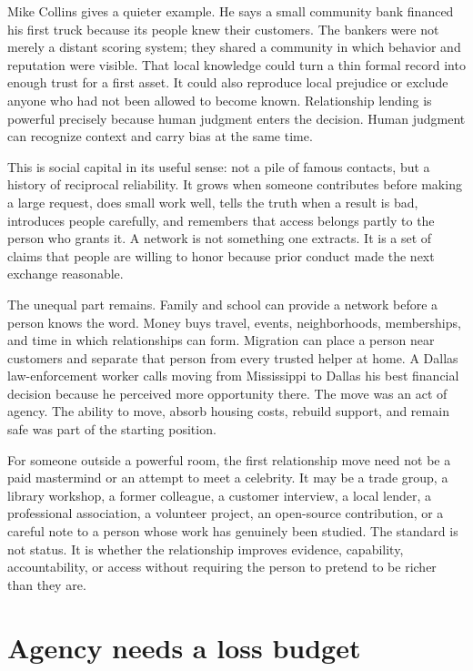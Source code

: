 Mike Collins gives a quieter example. He says a small community bank financed
his first truck because its people knew their customers. The bankers were not
merely a distant scoring system; they shared a community in which behavior and
reputation were visible. That local knowledge could turn a thin formal record
into enough trust for a first asset. It could also reproduce local prejudice or
exclude anyone who had not been allowed to become known. Relationship lending
is powerful precisely because human judgment enters the decision. Human
judgment can recognize context and carry bias at the same time.

This is social capital in its useful sense: not a pile of famous contacts, but
a history of reciprocal reliability. It grows when someone contributes before
making a large request, does small work well, tells the truth when a result is
bad, introduces people carefully, and remembers that access belongs partly to
the person who grants it. A network is not something one extracts. It is a set
of claims that people are willing to honor because prior conduct made the next
exchange reasonable.

The unequal part remains. Family and school can provide a network before a
person knows the word. Money buys travel, events, neighborhoods, memberships,
and time in which relationships can form. Migration can place a person near
customers and separate that person from every trusted helper at home. A Dallas
law-enforcement worker calls moving from Mississippi to Dallas his best
financial decision because he perceived more opportunity there. The move was
an act of agency. The ability to move, absorb housing costs, rebuild support,
and remain safe was part of the starting position.

For someone outside a powerful room, the first relationship move need not be a
paid mastermind or an attempt to meet a celebrity. It may be a trade group, a
library workshop, a former colleague, a customer interview, a local lender, a
professional association, a volunteer project, an open-source contribution, or
a careful note to a person whose work has genuinely been studied. The standard
is not status. It is whether the relationship improves evidence, capability,
accountability, or access without requiring the person to pretend to be richer
than they are.

\section{Agency needs a loss budget}

